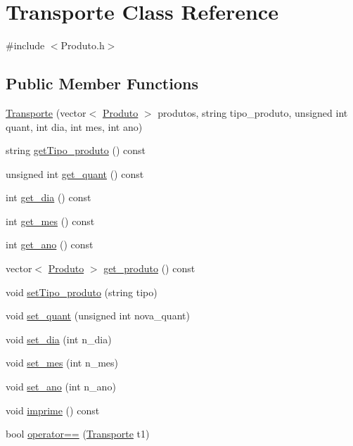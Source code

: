 \hypertarget{class_transporte}{
\section{Transporte Class Reference}
\label{class_transporte}
}


{\ttfamily \#include $<$Produto.h$>$}

\subsection*{Public Member Functions}
\begin{DoxyCompactItemize}
\item 
\hyperlink{class_transporte_a603c0b441b2007b8f9ff747bf85365ef}{Transporte} (vector$<$ \hyperlink{class_produto}{Produto} $>$ produtos, string tipo\_\-produto, unsigned int quant, int dia, int mes, int ano)
\item 
string \hyperlink{class_transporte_a8a9c31b65c34fd4e8b5f4fa6379f442b}{getTipo\_\-produto} () const 
\item 
unsigned int \hyperlink{class_transporte_a88d20dc7ed5290a3c4af6fff4e3f2bb5}{get\_\-quant} () const 
\item 
int \hyperlink{class_transporte_a5bf5ca32be298da9ea56d00146329964}{get\_\-dia} () const 
\item 
int \hyperlink{class_transporte_aa51551f4c0bf767fe9cee6abc0dee3f7}{get\_\-mes} () const 
\item 
int \hyperlink{class_transporte_a809728300579ffd0df168dbcee5cfa60}{get\_\-ano} () const 
\item 
vector$<$ \hyperlink{class_produto}{Produto} $>$ \hyperlink{class_transporte_ab364dffa082a2f62549e0b6a739bf161}{get\_\-produto} () const 
\item 
void \hyperlink{class_transporte_a9a1380e7589e7e5d69ce6c5264a77c72}{setTipo\_\-produto} (string tipo)
\item 
void \hyperlink{class_transporte_a89fd66d40a1f229f9794deaf0ffd62cd}{set\_\-quant} (unsigned int nova\_\-quant)
\item 
void \hyperlink{class_transporte_a1e659de05351545ace47c2e82bffda78}{set\_\-dia} (int n\_\-dia)
\item 
void \hyperlink{class_transporte_aff2c93df69b5ec23800864c6a5da0e6e}{set\_\-mes} (int n\_\-mes)
\item 
void \hyperlink{class_transporte_aecdf200fe3c928e212ccbfa10dd6249a}{set\_\-ano} (int n\_\-ano)
\item 
void \hyperlink{class_transporte_a4d9af11fe67e570a8d8787f825fdec84}{imprime} () const 
\item 
bool \hyperlink{class_transporte_a04f15f482b4a1052dcfcd8db5b26c0af}{operator==} (\hyperlink{class_transporte}{Transporte} t1)
\end{DoxyCompactItemize}


